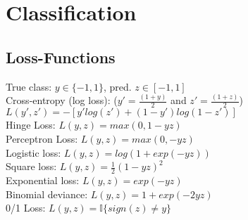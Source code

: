 \section{Classification}
\subsection*{Loss-Functions}
True class: $y \in \{-1,1\}$, pred. $z \in [-1,1]$\\
Cross-entropy (log loss): ($y'=\tfrac{(1+y)}{2}$ and $z'=\tfrac{(1+z)}{2}$) $L(y',z') {=} -[y'log(z') {+} (1-y')log(1-z')]$ \\
Hinge Loss: $L(y,z) = max(0, 1-yz)$ \\
Perceptron Loss: $L(y,z) = max(0, -yz)$ \\
Logistic loss: $L(y,z) = log(1 + exp(-yz))$ \\
Square loss: $L(y,z) = \tfrac{1}{2}(1-yz)^2$ \\
Exponential loss: $L(y,z) = exp(-yz)$ \\
Binomial deviance: $L(y,z) = 1 + exp(-2yz)$ \\
0/1 Loss: $L(y,z) = \mathbb{I}\{sign(z)\neq y\}$ \\


